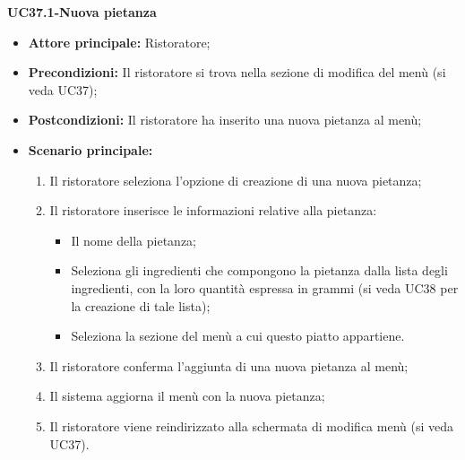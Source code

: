 \textbf{UC37.1-Nuova pietanza}
\begin{itemize}
    \item \textbf{Attore principale:} Ristoratore;
    \item \textbf{Precondizioni:} Il ristoratore si trova nella sezione di modifica del menù (si veda UC37);
    \item \textbf{Postcondizioni:} Il ristoratore ha inserito una nuova pietanza al menù;
    \item \textbf{Scenario principale:}
    \begin{enumerate}
        \item Il ristoratore seleziona l'opzione di creazione di una nuova pietanza;
        \item Il ristoratore inserisce le informazioni relative alla pietanza:
        \begin{itemize}
            \item Il nome della pietanza;
            \item Seleziona gli ingredienti che compongono la pietanza dalla lista degli ingredienti, con la loro quantità espressa in grammi (si veda UC38 per la creazione di tale lista);
            \item Seleziona la sezione del menù a cui questo piatto appartiene.
        \end{itemize}
        \item Il ristoratore conferma l'aggiunta di una nuova pietanza al menù;
        \item Il sistema aggiorna il menù con la nuova pietanza;
        \item Il ristoratore viene reindirizzato alla schermata di modifica menù (si veda UC37).
    \end{enumerate}
\end{itemize}


